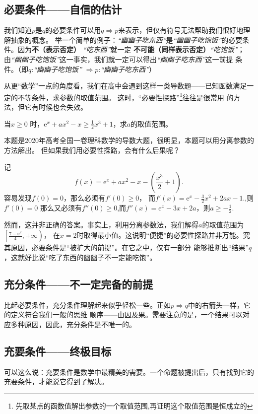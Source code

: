 \subsection{必要条件——自信的估计}
我们知道$p$是$q$的必要条件可以用$q \Rightarrow {p}$来表示，但仅有符号无法帮助我们很好地理解抽象的概念。
举一个简单的例子：\textit{“幽幽子吃东西”}是\textit{“幽幽子吃饱饭”}的必要条件。因为\textbf{不（表示否定） }\textit{“吃东西”}就一定%
\textbf{不可能（同样表示否定）}\textit{“吃饱饭”}；由\textit{“幽幽子吃饱饭”}这一事实，我们就一定可以得出\textit{“幽幽子吃东西”}这一前提
条件。（即$q$:\textit{“幽幽子吃饱饭”} $\Rightarrow p$:\textit{“幽幽子吃东西”}）


从更“数学”一点的角度看，我们在高中会遇到这样一类导数题——已知函数满足一定的不等条件，求参数的取值范围。
这时，“必要性探路”\footnote{先取某点的函数值解出参数的一个取值范围,再证明这个取值范围是恒成立的}往往是很常用
的方法，但它有时候也会失效。
\begin{example}
    当$x \geqslant 0$ 时，$\mathrm{e}^x+ax^2 -x \geqslant \frac{1}{2}x^3 +1$，求$a$的取值范围。
\end{example}
\begin{solve}
    本题是2020年高考全国一卷理科数学的导数大题，很明显，本题可以用分离参数的方法解出。
    但如果我们用必要性探路，会有什么后果呢？

    记
    \[
        f(x)=\mathrm{e}^x+ax^2 -x-\left (\frac{x^3}{2} +1\right )
        .\]
    容易发现$f(0)=0$，那么必须有$f'(0)\geqslant 0$，
    而$f'(x)=\mathrm e^x-\frac{3}{2}x^2+2ax-1.$,则
    $f'(0)=0$ 那么又必须有$f''(0)\geqslant 0$,而$f''(x)=\mathrm e^x-3x+2a$，则$a\geqslant -\frac{1}{2}$.

\end{solve}

然而，这并非正确的答案。事实上，利用分离参数法，我们解得$a$的取值范围为$\left [ \frac{7-\mathrm e^2}{4},+\infty  \right ) $，
在$x=2$时取得最小值。这说明“便捷”的必要性探路并非万能。究其原因，必要条件是“被扩大的前提”。在它之中，仅有一部分
能够推断出“结果”$q$，这就好比说“吃了东西的幽幽子不一定能吃饱”。

\subsection{充分条件——不一定完备的前提}
比起必要条件，充分条件理解起来似乎轻松一些。正如$p\Rightarrow q$中的右箭头一样，它的定义符合我们一般的思维
顺序——由因及果。需要注意的是，一个结果可以对应多种原因，因此，充分条件是不唯一的。

\subsection{充要条件——终极目标}
可以这么说：充要条件是数学中最精美的需要。一个命题被提出后，只有找到它的充要条件，才能说它得到了解决。


